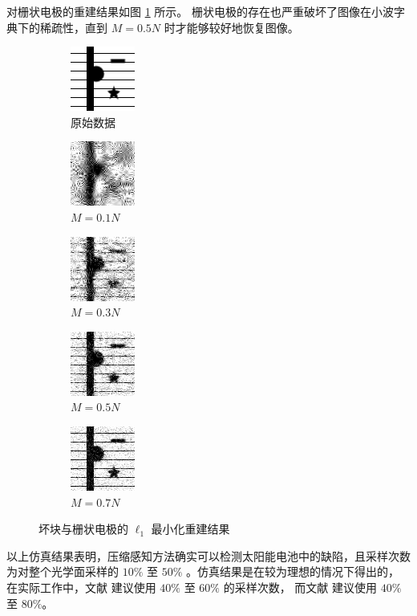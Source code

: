 对栅状电极的重建结果如图 \ref{fig:L1finger}
所示。 栅状电极的存在也严重破坏了图像在小波字典下的稀疏性，直到 $M = 0.5N$
时才能够较好地恢复图像。

\begin{figure}
\centering
\begin{subfigure}[t]{1.1in}
	\includegraphics{Figure/testdata/2dsharp_finger.png}
	\caption{原始数据}
\end{subfigure}
\begin{subfigure}[t]{1.1in}
	\includegraphics{Figure/L1/finger10.png}
	\caption{$M = 0.1 N$}
\end{subfigure}
\begin{subfigure}[t]{1.1in}
	\includegraphics{Figure/L1/finger30.png}
	\caption{$M = 0.3 N$}
\end{subfigure}
\begin{subfigure}[t]{1.1in}
	\includegraphics{Figure/L1/finger50.png}
	\caption{$M = 0.5 N$}
\end{subfigure}
\begin{subfigure}[t]{1.1in}
	\includegraphics{Figure/L1/finger70.png}
	\caption{$M = 0.7 N$}
\end{subfigure}
\caption{坏块与栅状电极的 $\ell_1$ 最小化重建结果}
\label{fig:L1finger}
\end{figure}

以上仿真结果表明，压缩感知方法确实可以检测太阳能电池中的缺陷，且采样次数
为对整个光学面采样的 $10\%$ 至 $50\%$ 。仿真结果是在较为理想的情况下得出的，
在实际工作中，文献 \cite{XDUCLBIC} 建议使用 $40\%$ 至 $60\%$ 的采样次数，
而文献 \cite{CLBIC17} 建议使用 $40\%$ 至 $80\%$。

